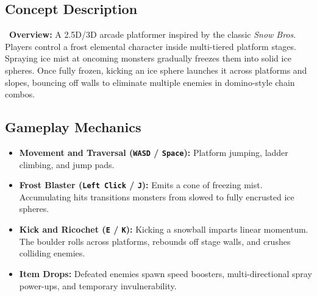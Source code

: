 \documentclass[11pt,a4paper]{article}
\begin{document}
\subsection{Concept Description}
\noindent\faGamepad\ \textbf{Overview:} A 2.5D/3D arcade platformer inspired by the classic \textit{Snow Bros}. Players control a frost elemental character inside multi-tiered platform stages. Spraying ice mist at oncoming monsters gradually freezes them into solid ice spheres. Once fully frozen, kicking an ice sphere launches it across platforms and slopes, bouncing off walls to eliminate multiple enemies in domino-style chain combos.

\subsection{Gameplay Mechanics}
\begin{itemize}
    \item \textbf{Movement and Traversal (\texttt{WASD} / \texttt{Space}):} Platform jumping, ladder climbing, and jump pads.
    \item \textbf{Frost Blaster (\texttt{Left Click} / \texttt{J}):} Emits a cone of freezing mist. Accumulating hits transitions monsters from slowed to fully encrusted ice spheres.
    \item \textbf{Kick and Ricochet (\texttt{E} / \texttt{K}):} Kicking a snowball imparts linear momentum. The boulder rolls across platforms, rebounds off stage walls, and crushes colliding enemies.
    \item \textbf{Item Drops:} Defeated enemies spawn speed boosters, multi-directional spray power-ups, and temporary invulnerability.
\end{itemize}
\end{document}
